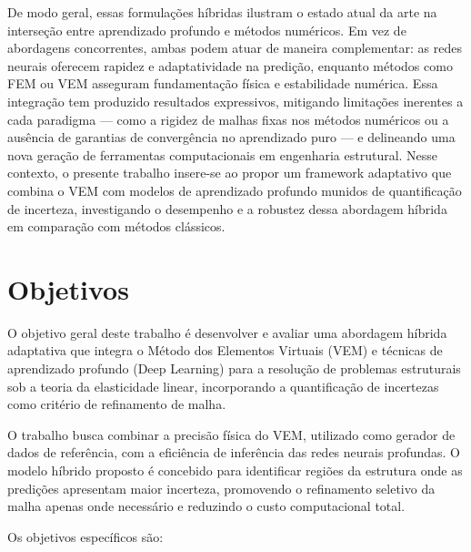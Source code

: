 \documentclass[12pt,openright,oneside,a4paper,english,brazil]{abntex2}
\begin{document}
De modo geral, essas formulações híbridas ilustram o estado atual da arte na interseção entre aprendizado profundo e métodos numéricos. Em vez de abordagens concorrentes, ambas podem atuar de maneira complementar: as redes neurais oferecem rapidez e adaptatividade na predição, enquanto métodos como FEM ou VEM asseguram fundamentação física e estabilidade numérica. Essa integração tem 
produzido resultados expressivos, mitigando limitações inerentes a cada paradigma — como a rigidez de malhas fixas nos métodos numéricos ou a ausência de garantias de convergência no aprendizado puro — e delineando uma nova geração de ferramentas computacionais em engenharia estrutural. Nesse contexto, o presente trabalho insere-se ao propor um framework adaptativo que combina o VEM com 
modelos de aprendizado profundo munidos de quantificação de incerteza, investigando o desempenho e a robustez dessa abordagem híbrida em comparação com métodos clássicos.

\chapter{Objetivos}

O objetivo geral deste trabalho é desenvolver e avaliar uma abordagem híbrida adaptativa que integra o Método dos Elementos Virtuais (VEM) e técnicas de aprendizado profundo (Deep Learning) para a resolução de problemas estruturais sob a teoria da elasticidade linear, incorporando a quantificação de incertezas como critério de refinamento de malha.

O trabalho busca combinar a precisão física do VEM, utilizado como gerador de dados de referência, com a eficiência de inferência das redes neurais profundas. O modelo híbrido proposto é concebido para identificar regiões da estrutura onde as predições apresentam maior incerteza, promovendo o refinamento seletivo da malha apenas onde necessário e reduzindo o custo computacional total.

Os objetivos específicos são:
\end{document}
